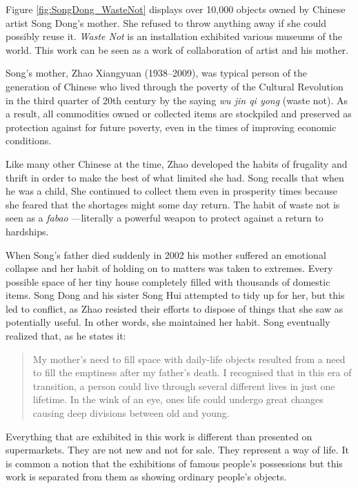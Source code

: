 Figure \ref{fig:SongDong_WasteNot} displays over 10,000 objects owned by Chinese artist Song Dong’s mother. She refused to throw anything away if she could possibly reuse it. \textit{Waste Not} is an installation exhibited various museums of the world. This work can be seen as a work of collaboration of artist and his mother.

Song’s mother, Zhao Xiangyuan (1938–2009), was typical person of the generation of Chinese who lived through the poverty of the Cultural Revolution in the third quarter of 20th century by the saying \textit{wu jin qi yong} (waste not). As a result, all commodities owned or collected items are stockpiled and preserved as protection against for future poverty, even in the times of improving economic conditions.

Like many other Chinese at the time, Zhao developed the habits of frugality and thrift in order to make the best of what limited she had. Song recalls that when he was a child,  She continued to collect them even in prosperity times because she feared that the shortages might some day return. The habit of waste not is seen as a \textit{fabao} ---literally a powerful weapon to protect against a return to hardships.

When Song’s father died suddenly in 2002 his mother suffered an emotional collapse and her habit of holding on to matters was taken to extremes. Every possible space of her tiny house completely filled with thousands of domestic items. Song Dong and his sister Song Hui attempted to tidy up for her, but this led to conflict, as Zhao resisted their efforts to dispose of things that she saw as potentially useful. In other words, she maintained her habit. Song eventually realized that, as he states it:

\begin{quote}
My mother’s need to fill space with daily-life objects resulted from a need to fill the emptiness after my father’s death. I recognised that in this era of transition, a person could live through several different lives in just one lifetime. In the wink of an eye, ones life could undergo great changes causing deep divisions between old and young.
\end{quote}

Everything that are exhibited in this work is different than presented on supermarkets. They are not new and not for sale. They represent a way of life. It is common a notion that the exhibitions of famous people’s possessions but this work is separated from them as showing ordinary people’s objects.

